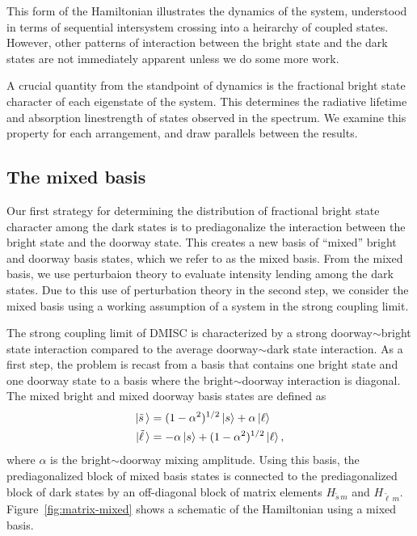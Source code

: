 \documentclass[12pt]{mitthesis}
\newcommand{\ts}{\tilde{s}\,}
\newcommand{\tl}{\tilde{\ell}\,}
\begin{document}
This form of the Hamiltonian illustrates the dynamics of the system,
understood in terms of sequential intersystem crossing into a
heirarchy of coupled states. However, other patterns of interaction
between the bright state and the dark states are not immediately
apparent unless we do some more work.

A crucial quantity from the standpoint of dynamics is the fractional
bright state character of each eigenstate of the system. This
determines the radiative lifetime and absorption linestrength of
states observed in the spectrum. We examine this property for each
arrangement, and draw parallels between the results.

\subsection{The mixed basis}
\label{sec:mixed-basis}

Our first strategy for determining the distribution of fractional
bright state character among the dark states is to prediagonalize the
interaction between the bright state and the doorway state.  This
creates a new basis of ``mixed'' bright and doorway basis states,
which we refer to as the mixed basis.  From the mixed basis, we use
perturbaion theory to evaluate intensity lending among the dark
states.  
Due to this use of perturbation theory in the second step, we
consider the mixed basis using a working assumption of a system in the
strong coupling limit.

The strong coupling limit of DMISC is characterized by a strong
doorway$\sim$bright state interaction compared to the average
doorway$\sim$dark state interaction. As a first step, the problem is
recast from a basis that contains one bright state and one doorway
state to a basis where the bright$\sim$doorway interaction is
diagonal.  The mixed bright and mixed doorway basis states are defined
as
\begin{equation}
  \label{eq:mixed-basis-def}
  \begin{split}
    \ket{\ts} & = (1-\alpha^2)^{1/2} \ket{s} + \alpha \ket{\ell} \\
    \ket{\tl} & = - \alpha \ket{s} + (1-\alpha^2)^{1/2} \ket{\ell},
  \end{split}
\end{equation}
where $\alpha$ is the bright$\sim$doorway mixing amplitude. Using this
basis, the prediagonalized block of mixed basis states is connected to
the prediagonalized block of dark states by an off-diagonal block of
matrix elements $H_{\ts m}$ and $H_{\tl
  m}$. Figure~\ref{fig:matrix-mixed} shows a schematic of the
Hamiltonian using a mixed basis.
\end{document}
